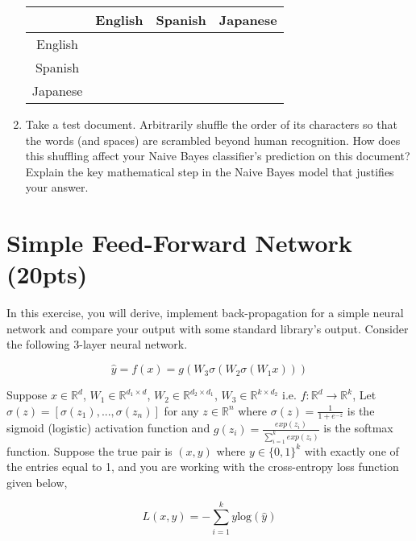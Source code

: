 \documentclass[a4paper]{article}
\theoremstyle{definition}
\begin{document}
\begin{enumerate}
\begin{center}
\begin{tabular}{c|ccc}
& English & Spanish & Japanese \\
\hline
English&&&\\
Spanish&&&\\
Japanese&&&
\end{tabular}
\end{center}

\item Take a test document.   Arbitrarily shuffle the order of its characters so that the words (and spaces) are scrambled beyond human recognition.  How does this shuffling affect your Naive Bayes classifier's prediction on this document?  Explain the key mathematical step in the Naive Bayes model that justifies your answer.

\end{enumerate}

\section{Simple Feed-Forward Network (20pts)}
In this exercise, you will derive, implement back-propagation for a simple neural network and compare your output with some standard library’s output. Consider the following 3-layer neural network.

\[
\hat{y} = f(x) = g(W_3\sigma(W_2\sigma(W_1x)))
\]

Suppose $x \in \mathbb{R}^d$, $W_1 \in \mathbb{R}^{d_1 \times d}$, $W_2 \in \mathbb{R}^{d_2 \times d_1}$, $W_3 \in \mathbb{R}^{k \times d_2}$ i.e. $f: \mathbb{R}^d \rightarrow \mathbb{R}^k$, Let $\sigma(z) = [\sigma(z_1), ..., \sigma(z_n)]$ for any $z \in \mathbb{R}^n$ where $\sigma(z) = \frac{1}{1 + e^{-z}}$ is the sigmoid (logistic) activation function and $g(z_i) = \frac{exp(z_i)}{\sum_{i=1}^k exp(z_i)}$ is the softmax function. Suppose the true pair is $(x, y)$ where $y \in \{0, 1\}^k$ with exactly one of the entries equal to 1, and you are working with the cross-entropy loss function given below,

\[
L(x, y) = -\sum_{i=1}^k y \text{log}(\hat{y})
\]
\end{document}
